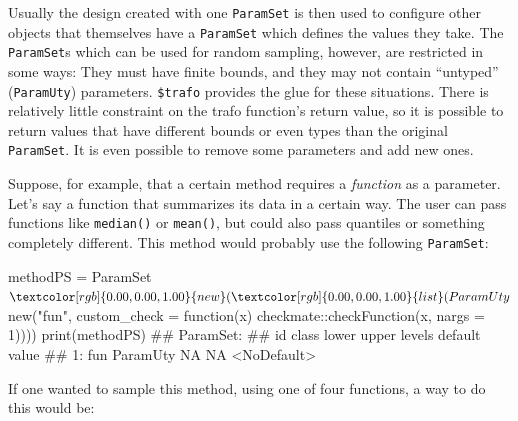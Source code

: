 \documentclass[12pt,]{scrbook}
\newenvironment{Shaded}{}{}
\newcommand{\CommentTok}[1]{\textcolor[rgb]{0.00,0.50,0.00}{#1}}
\newcommand{\ControlFlowTok}[1]{\textcolor[rgb]{0.00,0.00,1.00}{#1}}
\newcommand{\DataTypeTok}[1]{#1}
\newcommand{\DecValTok}[1]{#1}
\newcommand{\KeywordTok}[1]{\textcolor[rgb]{0.00,0.00,1.00}{#1}}
\newcommand{\NormalTok}[1]{#1}
\newcommand{\OperatorTok}[1]{#1}
\newcommand{\StringTok}[1]{\textcolor[rgb]{0.00,0.50,0.50}{#1}}
\begin{document}
Usually the design created with one \texttt{ParamSet} is then used to configure other objects that themselves have a \texttt{ParamSet} which defines the values they take.
The \texttt{ParamSet}s which can be used for random sampling, however, are restricted in some ways:
They must have finite bounds, and they may not contain ``untyped'' (\texttt{ParamUty}) parameters.
\texttt{\$trafo} provides the glue for these situations.
There is relatively little constraint on the trafo function's return value, so it is possible to return values that have different bounds or even types than the original \texttt{ParamSet}.
It is even possible to remove some parameters and add new ones.

Suppose, for example, that a certain method requires a \emph{function} as a parameter.
Let's say a function that summarizes its data in a certain way.
The user can pass functions like \texttt{median()} or \texttt{mean()}, but could also pass quantiles or something completely different.
This method would probably use the following \texttt{ParamSet}:

\begin{Shaded}
\begin{Highlighting}[]
\NormalTok{methodPS =}\StringTok{ }\NormalTok{ParamSet}\OperatorTok{$}\KeywordTok{new}\NormalTok{(}\KeywordTok{list}\NormalTok{(ParamUty}\OperatorTok{$}\KeywordTok{new}\NormalTok{(}\StringTok{"fun"}\NormalTok{, }\DataTypeTok{custom_check =} \ControlFlowTok{function}\NormalTok{(x) checkmate}\OperatorTok{::}\KeywordTok{checkFunction}\NormalTok{(x, }
  \DataTypeTok{nargs =} \DecValTok{1}\NormalTok{))))}
\KeywordTok{print}\NormalTok{(methodPS)}
\NormalTok{## ParamSet: }
\NormalTok{##     id    class lower upper levels     default value}
\NormalTok{## 1: fun ParamUty    NA    NA        <NoDefault>}
\end{Highlighting}
\end{Shaded}

If one wanted to sample this method, using one of four functions, a way to do this would be:

\begin{Shaded}
\end{Shaded}
\end{document}

